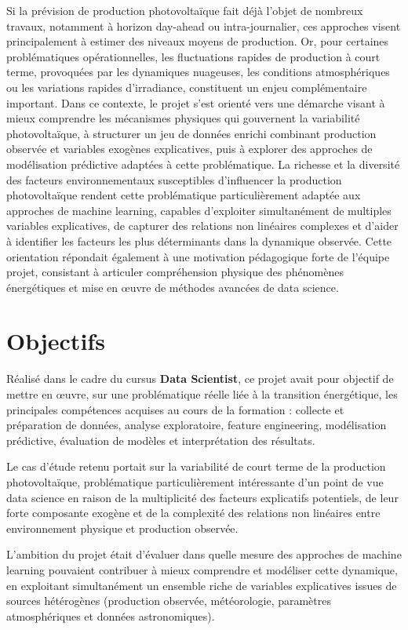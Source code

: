 Si la prévision de production photovoltaïque fait déjà l’objet de nombreux travaux, notamment à horizon
day-ahead ou intra-journalier, ces approches visent principalement à estimer des niveaux moyens de
production. Or, pour certaines problématiques opérationnelles, les fluctuations rapides de production à
court terme, provoquées par les dynamiques nuageuses, les conditions atmosphériques ou les
variations rapides d’irradiance, constituent un enjeu complémentaire important. Dans ce contexte, le
projet s’est orienté vers une démarche visant à mieux comprendre les mécanismes physiques qui
gouvernent la variabilité photovoltaïque, à structurer un jeu de données enrichi combinant production
observée et variables exogènes explicatives, puis à explorer des approches de modélisation prédictive
adaptées à cette problématique. La richesse et la diversité des facteurs environnementaux susceptibles
d’influencer la production photovoltaïque rendent cette problématique particulièrement adaptée aux
approches de machine learning, capables d’exploiter simultanément de multiples variables explicatives,
de capturer des relations non linéaires complexes et d’aider à identifier les facteurs les plus
déterminants dans la dynamique observée. Cette orientation répondait également à une motivation
pédagogique forte de l’équipe projet, consistant à articuler compréhension physique des phénomènes
énergétiques et mise en œuvre de méthodes avancées de data science.

\section{Objectifs}

Réalisé dans le cadre du cursus \textbf{Data Scientist}, ce projet avait pour objectif de mettre en œuvre, sur une
problématique réelle liée à la transition énergétique, les principales compétences acquises au cours de
la formation : collecte et préparation de données, analyse exploratoire, feature engineering, modélisation
prédictive, évaluation de modèles et interprétation des résultats.

Le cas d’étude retenu portait sur la variabilité de court terme de la production photovoltaïque,
problématique particulièrement intéressante d’un point de vue data science en raison de la multiplicité
des facteurs explicatifs potentiels, de leur forte composante exogène et de la complexité des relations
non linéaires entre environnement physique et production observée.

L’ambition du projet était d’évaluer dans quelle mesure des approches de machine learning pouvaient
contribuer à mieux comprendre et modéliser cette dynamique, en exploitant simultanément un ensemble
riche de variables explicatives issues de sources hétérogènes (production observée, météorologie,
paramètres atmosphériques et données astronomiques).

